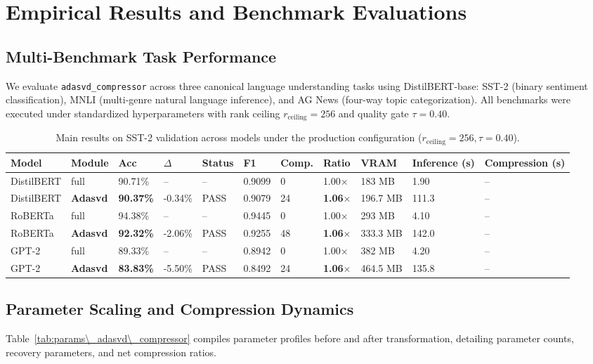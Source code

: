 \section{Empirical Results and Benchmark Evaluations}
\label{sec:results}

\subsection{Multi-Benchmark Task Performance}
We evaluate \texttt{adasvd\_compressor} across three canonical language understanding tasks using DistilBERT-base: SST-2 (binary sentiment classification), MNLI (multi-genre natural language inference), and AG News (four-way topic categorization). All benchmarks were executed under standardized hyperparameters with rank ceiling $r_{\mathrm{ceiling}} = 256$ and quality gate $\tau = 0.40$.

\begin{table}[t]
\centering
\small
\begin{tabular}{lllllllllll}
\toprule
\textbf{Model} & \textbf{Module} & \textbf{Acc} & \textbf{$\Delta$} & \textbf{Status} & \textbf{F1} & \textbf{Comp.} & \textbf{Ratio} & \textbf{VRAM} & \textbf{Inference (s)} & \textbf{Compression (s)} \\
\midrule
DistilBERT & full & 90.71\% & -- & -- & 0.9099 & 0 & 1.00$\times$ & 183 MB & 1.90 & -- \\
DistilBERT & \textbf{Adasvd} & \textbf{90.37\%} & -0.34\% & PASS & 0.9079 & 24 & \textbf{1.06$\times$} & 196.7 MB & 111.3 & -- \\
RoBERTa & full & 94.38\% & -- & -- & 0.9445 & 0 & 1.00$\times$ & 293 MB & 4.10 & -- \\
RoBERTa & \textbf{Adasvd} & \textbf{92.32\%} & -2.06\% & PASS & 0.9255 & 48 & \textbf{1.06$\times$} & 333.3 MB & 142.0 & -- \\
GPT-2 & full & 89.33\% & -- & -- & 0.8942 & 0 & 1.00$\times$ & 382 MB & 4.20 & -- \\
GPT-2 & \textbf{Adasvd} & \textbf{83.83\%} & -5.50\% & PASS & 0.8492 & 24 & \textbf{1.06$\times$} & 464.5 MB & 135.8 & -- \\
\bottomrule
\end{tabular}
\caption{Main results on SST-2 validation across models under the production configuration ($r_{\mathrm{ceiling}}=256, \tau=0.40$).}
\label{tab:main\_sst2}
\end{table}

\subsection{Parameter Scaling and Compression Dynamics}
Table~\ref{tab:params\_adasvd\_compressor} compiles parameter profiles before and after transformation, detailing parameter counts, recovery parameters, and net compression ratios.

